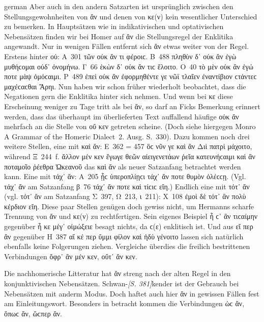 \begin{otherlanguage*}{german}
Aber auch in den andern Satzarten ist ursprünglich zwischen den Stellungsgewohnheiten von ἄν und denen von κε(ν) kein wesentlicher Unterschied zu bemerken. In Hauptsätzen wie in indikativischen und optativischen Nebensätzen finden wir bei Homer auf ἄν die Stellungsregel der Enklitika angewandt. Nur in wenigen Fällen entfernt sich ἄν etwas weiter von der Regel. Erstens hinter οὐ: Α~301 τῶν οὐκ ἄν τι φέροιϲ. Β~488 πληθὺν δ᾽ οὐκ ἂν ἐγὼ μυθήϲομαι οὐδ᾽ ὀνομήνω. Γ~66 ἑκὼν δ᾽ οὐκ ἄν τιϲ ἕλοιτο. Ο~40 τὸ μὲν οὐκ ἂν ἐγώ ποτε μὰψ ὀμόϲαιμι. Ρ~489 ἐπεὶ οὐκ ἂν ἐφορμηθέντε γε νῶϊ τλαῖεν ἐναντίβιον ϲτάντεϲ μαχέϲαϲθαι Ἄρηι. Nun haben wir schon früher wiederholt beobachtet, dass die Negationen gern die Enklitika hinter sich nehmen. Und wenn bei κε diese Erscheinung weniger zu Tage tritt als bei ἄν, so darf an Ficks Bemerkung erinnert werden, dass das überhaupt im überlieferten Text auffallend häufige οὐκ ἄν mehrfach an die Stelle von οὔ κεν getreten scheine. (Doch siehe hiergegen Monro A Grammar of the Homeric Dialect~2. Ausg. S.~330). Dazu kommen noch drei weitere Stellen, eine mit καὶ ἄν: Ε~362 = 457 ὃϲ νῦν γε καὶ ἂν Διὶ πατρὶ μάχοιτο, während Ξ~244~f. ἄλλον μέν κεν ἔγωγε θεῶν αἰειγενετάων ῥεῖα κατευνήϲαιμι καὶ ἂν ποταμοῖο ῥέεθρα Ὠκεανοῦ das καὶ ἄν als neuer Satzanfang betrachtet werden kann. Eine mit τάχ᾽ ἄν: Α~205 ᾗϲ ὑπεροπλίῃϲι τάχ᾽ ἄν ποτε θυμὸν ὀλέϲϲῃ. (Vgl. τάχ᾽ ἄν am Satzanfang β~76 τάχ᾽ ἄν ποτε καὶ τίϲιϲ εἴη.) Endlich eine mit τότ᾽ ἄν (vgl. τότ᾽ ἄν am Satzanfang Σ~397, Ω~213, ι~211): Χ~108 ἐμοὶ δὲ τότ᾽ ἂν πολὺ κέρδιον εἴη. Diese paar Stellen genügen doch gewiss nicht, um Hermanns scharfe Trennung von ἄν und κε(ν) zu rechtfertigen. Sein eigenes Beispiel ἦ ϲ᾽ ἂν τιϲαίμην gegenüber ἦ κε μέγ᾽ οἰμώξειε besagt nichts, da ϲ(ε) enklitisch ist. Und aus εἴ περ ἄν gegenüber Η~387 αἴ κέ περ ὔμμι φίλον καὶ ἡδὺ γένοιτο lassen sich natürlich ebenfalls keine Folgerungen ziehen. Vergleiche überdies die freilich bestrittenen Verbindungen ὄφρ᾽ ἂν μέν κεν, οὔτ᾽ ἄν κεν.

Die nachhomerische Litteratur hat ἄν streng nach der alten Regel in den konjunktivischen Nebensätzen. Schwan-\hypertarget{p381}{\emph{[S. 381]}}\label{p381}kender ist der Gebrauch bei Nebensätzen mit anderm Modus. Doch haftet auch hier ἄν in gewissen Fällen fest am Einleitungswort. Besonders in betracht kommen die Verbindungen ὡϲ ἄν, ὅπωϲ ἄν, ὥϲπερ ἄν.


\end{otherlanguage*}
